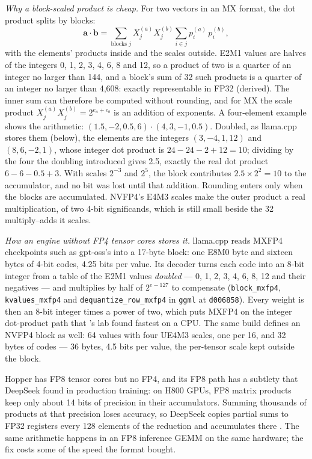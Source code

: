 \emph{Why a block-scaled product is cheap.} For two vectors in an MX format,
the dot product splits by blocks:
\begin{equation}
\mathbf{a}\cdot\mathbf{b} = \sum_{\text{blocks } j} X^{(a)}_j X^{(b)}_j
\sum_{i \in j} p^{(a)}_i\, p^{(b)}_i ,
\label{eq:block-dot}
\end{equation}
with the elements' products inside and the scales outside. E2M1 values are
halves of the integers 0, 1, 2, 3, 4, 6, 8 and 12, so a product of two is a
quarter of an integer no larger than 144, and a block's sum of 32 such products
is a quarter of an integer no larger than 4,608: exactly representable in FP32
(derived). The inner sum can therefore be computed without rounding, and for MX
the scale product $X^{(a)}_j X^{(b)}_j = 2^{e_a + e_b}$ is an addition of
exponents. A four-element example shows the arithmetic: $(1.5, -2, 0.5, 6) \cdot
(4, 3, -1, 0.5)$. Doubled, as llama.cpp stores them (below), the elements are the
integers $(3, -4, 1, 12)$ and $(8, 6, -2, 1)$, whose integer dot product is
$24 - 24 - 2 + 12 = 10$; dividing by the four the doubling introduced gives 2.5,
exactly the real dot product $6 - 6 - 0.5 + 3$. With scales $2^{-3}$ and $2^{5}$,
the block contributes $2.5 \times 2^{2} = 10$ to the accumulator, and no bit was
lost until that addition. Rounding enters only when the blocks are accumulated. NVFP4's E4M3
scales make the outer product a real multiplication, of two 4-bit significands,
which is still small beside the 32 multiply--adds it scales.

\emph{How an engine without FP4 tensor cores stores it.} llama.cpp reads MXFP4
checkpoints such as gpt-oss's into a 17-byte block: one E8M0 byte and sixteen
bytes of 4-bit codes, 4.25 bits per value. Its decoder turns each code into an
8-bit integer from a table of the E2M1 values \emph{doubled} --- 0, 1, 2, 3, 4, 6,
8, 12 and their negatives --- and multiplies by half of $2^{e-127}$ to compensate
(\texttt{block\_mxfp4}, \texttt{kvalues\_mxfp4} and
\texttt{dequantize\_row\_mxfp4} in \texttt{ggml} at \texttt{d006858}). Every
weight is then an 8-bit integer times a power of two, which puts MXFP4 on the
integer dot-product path that 's lab found fastest on
a CPU. The same build defines an NVFP4 block as well: 64 values with four UE4M3
scales, one per 16, and 32 bytes of codes --- 36 bytes, 4.5 bits per value, the
per-tensor scale kept outside the block.

Hopper has FP8 tensor cores but no FP4, and its FP8 path has a subtlety that
DeepSeek found in production training: on H800 GPUs, FP8 matrix products keep
only about 14 bits of precision in their accumulators. Summing thousands of
products at that precision loses accuracy, so DeepSeek copies partial sums to
FP32 registers every 128 elements of the reduction and accumulates there
\cite{deepseek2024v3}. The same arithmetic happens in an FP8 inference GEMM on
the same hardware; the fix costs some of the speed the format bought.

